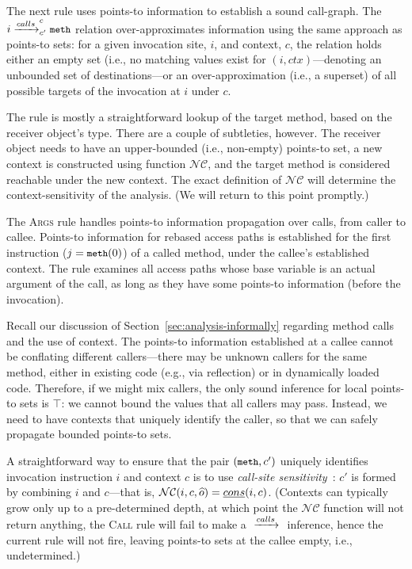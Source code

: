 
The next rule uses points-to information to establish a sound call-graph.
The \({i} \xrightarrow{calls}^{c}_{c'} {{\small {\texttt{meth}}}}\) relation 
over-approximates information using the same approach as points-to
sets: for a given invocation site, \(i\), and context, \(c\),
the relation holds either  an empty set (i.e., no matching values
exist for \((i,ctx)\)---denoting an unbounded set of
destinations---or an over-approximation (i.e., a superset) of all
possible targets of the invocation at \(i\) under \(c\).

The rule is mostly a straightforward lookup of the target method,
based on the receiver object's type. There are a couple of subtleties,
however. The receiver object needs to have an upper-bounded (i.e.,
non-empty) points-to set, a new context is constructed using
function \(\mathcal{NC}\), and the target method is considered reachable
under the new context. The exact definition of \(\mathcal{NC}\)
will determine the context-sensitivity of the analysis. (We will
return to this point promptly.)


The \textsc{Args} rule handles points-to information propagation over
calls, from caller to callee. Points-to information for rebased access
paths is established for the first instruction (\(j = {\small {\texttt{meth}}}(0)\))
  of a called method, under the callee's established context.
  The rule examines all access paths whose base variable is an actual
argument of the call, as long as they have some points-to information
(before the invocation).

Recall our discussion of Section~\ref{sec:analysis-informally}
regarding method calls and the use of context.  The points-to
information established at a callee cannot be conflating different
callers---there may be unknown callers for the same method, either in
existing code (e.g., via reflection) or in dynamically loaded
code. Therefore, if we might mix callers, the only sound inference for
local points-to sets is $\top$: we cannot bound the values that all
callers may pass. Instead, we need to have contexts that uniquely
identify the caller, so that we can safely propagate bounded points-to
sets.

A straightforward way to ensure that the pair \(({\small {\texttt{meth}}},c')\)
uniquely identifies invocation instruction \(i\) and context \(c\)
is to use \emph{call-site sensitivity}~\cite{col:1981:Sharir,thesis:Shivers}:
\(c'\) is formed by combining \(i\) and \(c\)---that is,
\(\mathcal{NC}(i,c,{\widehat{o}}) = \emph{cons}(i,c)\).
(Contexts can typically
grow only up to a pre-determined depth, at which point the
\(\mathcal{NC}\) function will not return anything, the \textsc{Call}
rule will fail to make a \({} \xrightarrow{calls}^{}_{} {}\) inference, hence the
current rule will not fire, leaving points-to sets at the callee
empty, i.e., undetermined.)



